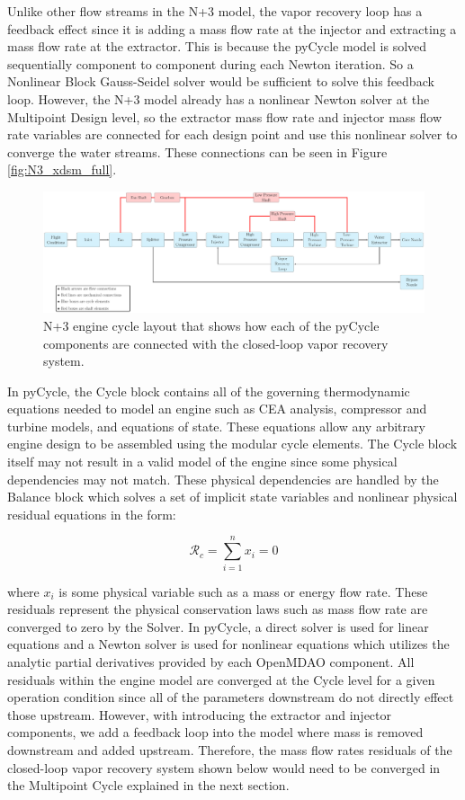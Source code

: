 \documentclass[conf]{new-aiaa}
\begin{document}
Unlike other flow streams in the N+3 model, the vapor recovery loop has a feedback effect since it is adding a mass flow rate at the injector and extracting a mass flow rate at the extractor.
This is because the pyCycle model is solved sequentially component to component during each Newton iteration.
So a Nonlinear Block Gauss-Seidel solver would be sufficient to solve this feedback loop.
However, the N+3 model already has a nonlinear Newton solver at the Multipoint Design level, so the extractor mass flow rate and injector mass flow rate variables are connected for each design point and use this nonlinear solver to converge the water streams.
These connections can be seen in Figure \ref{fig:N3_xdsm_full}.

\begin{figure}[hbt!]
    \centering
    \includegraphics[width=1.0\textwidth]{N3_CLVR_cycle.pdf}
    \caption{
        N+3 engine cycle layout that shows how each of the pyCycle components are connected with the closed-loop vapor recovery system. %
    }
    \label{fig:n3_clvr}
\end{figure}

In pyCycle, the Cycle block contains all of the governing thermodynamic equations needed to model an engine such as CEA analysis, compressor and turbine models, and equations of state.
These equations allow any arbitrary engine design to be assembled using the modular cycle elements.
The Cycle block itself may not result in a valid model of the engine since some physical dependencies may not match.
These physical dependencies are handled by the Balance block which solves a set of implicit state variables and nonlinear physical residual equations in the form:

\begin{equation}
    \mathcal{R}_c = \sum_{i=1}^{n} x_i = 0
\end{equation}

\noindent
where $x_i$ is some physical variable such as a mass or energy flow rate.
These residuals represent the physical conservation laws such as mass flow rate are converged to zero by the Solver.
In pyCycle, a direct solver is used for linear equations and a Newton solver is used for nonlinear equations which utilizes the analytic partial derivatives provided by each OpenMDAO component.
All residuals within the engine model are converged at the Cycle level for a given operation condition since all of the parameters downstream do not directly effect those upstream.
However, with introducing the extractor and injector components, we add a feedback loop into the model where mass is removed downstream and added upstream.
Therefore, the mass flow rates residuals of the closed-loop vapor recovery system shown below would need to be converged in the Multipoint Cycle explained in the next section.
\end{document}
